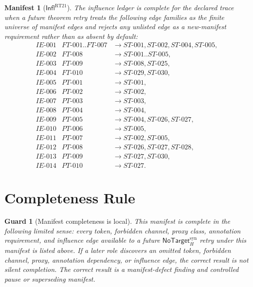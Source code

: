 \documentclass[11pt]{article}
\newcommand{\NoTargetSyn}{\mathsf{NoTarget}_{H}^{\mathrm{syn}}}
\newcommand{\Influence}{\mathsf{Infl}}
\newtheorem{manifest}{Manifest}
\newtheorem{guard}{Guard}
\begin{document}
\begin{manifest}[\(\Influence^{\mathrm{RT21}}\)]
The influence ledger is complete for the declared trace when a future theorem
retry treats the following edge families as the finite universe of manifest
edges and rejects any unlisted edge as a new-manifest requirement rather than
as absent by default:
\[
\begin{array}{lll}
IE\text{-}001 & FT\text{-}001..FT\text{-}007 & \rightarrow ST\text{-}001,ST\text{-}002,ST\text{-}004,ST\text{-}005,\\
IE\text{-}002 & FT\text{-}008 & \rightarrow ST\text{-}001..ST\text{-}005,\\
IE\text{-}003 & FT\text{-}009 & \rightarrow ST\text{-}008,ST\text{-}025,\\
IE\text{-}004 & FT\text{-}010 & \rightarrow ST\text{-}029,ST\text{-}030,\\
IE\text{-}005 & PT\text{-}001 & \rightarrow ST\text{-}001,\\
IE\text{-}006 & PT\text{-}002 & \rightarrow ST\text{-}002,\\
IE\text{-}007 & PT\text{-}003 & \rightarrow ST\text{-}003,\\
IE\text{-}008 & PT\text{-}004 & \rightarrow ST\text{-}004,\\
IE\text{-}009 & PT\text{-}005 & \rightarrow ST\text{-}004,ST\text{-}026,ST\text{-}027,\\
IE\text{-}010 & PT\text{-}006 & \rightarrow ST\text{-}005,\\
IE\text{-}011 & PT\text{-}007 & \rightarrow ST\text{-}002,ST\text{-}005,\\
IE\text{-}012 & PT\text{-}008 & \rightarrow ST\text{-}026,ST\text{-}027,ST\text{-}028,\\
IE\text{-}013 & PT\text{-}009 & \rightarrow ST\text{-}027,ST\text{-}030,\\
IE\text{-}014 & PT\text{-}010 & \rightarrow ST\text{-}027.
\end{array}
\]
\end{manifest}

\section{Completeness Rule}

\begin{guard}[Manifest completeness is local]
This manifest is complete in the following limited sense: every token,
forbidden channel, proxy class, annotation requirement, and influence edge
available to a future \(\NoTargetSyn\) retry under this manifest is listed
above. If a later role discovers an omitted token, forbidden channel, proxy,
annotation dependency, or influence edge, the correct result is not silent
completion. The correct result is a manifest-defect finding and controlled
pause or superseding manifest.
\end{guard}
\end{document}
